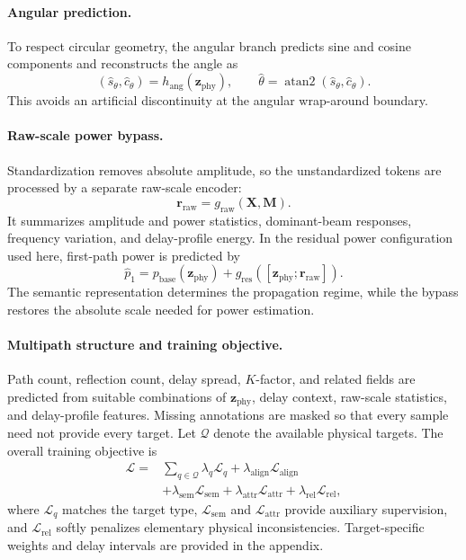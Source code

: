 \paragraph{Angular prediction.}
To respect circular geometry, the angular branch predicts sine and cosine components and reconstructs
the angle as
\begin{equation}
(\hat s_\theta,\hat c_\theta)=h_{\mathrm{ang}}(\mathbf z_{\mathrm{phy}}),
\qquad
\hat\theta=\operatorname{atan2}(\hat s_\theta,\hat c_\theta).
\label{eq:angular-prediction}
\end{equation}
This avoids an artificial discontinuity at the angular wrap-around boundary.

\paragraph{Raw-scale power bypass.}
Standardization removes absolute amplitude, so the unstandardized tokens are processed by a separate
raw-scale encoder:
\begin{equation}
\mathbf r_{\mathrm{raw}}=g_{\mathrm{raw}}(\mathbf X,\mathbf M).
\label{eq:raw-power-feature}
\end{equation}
It summarizes amplitude and power statistics, dominant-beam responses, frequency variation, and
delay-profile energy. In the residual power configuration used here, first-path power is predicted by
\begin{equation}
\hat p_1=p_{\mathrm{base}}(\mathbf z_{\mathrm{phy}})
+g_{\mathrm{res}}([\mathbf z_{\mathrm{phy}};\mathbf r_{\mathrm{raw}}]).
\label{eq:residual-power-prediction}
\end{equation}
The semantic representation determines the propagation regime, while the bypass restores the absolute
scale needed for power estimation.

\paragraph{Multipath structure and training objective.}
Path count, reflection count, delay spread, $K$-factor, and related fields are predicted from suitable
combinations of $\mathbf z_{\mathrm{phy}}$, delay context, raw-scale statistics, and delay-profile
features. Missing annotations are masked so that every sample need not provide every target. Let
$\mathcal Q$ denote the available physical targets. The overall training objective is
\begin{align}
\mathcal L
={}&\sum_{q\in\mathcal Q}\lambda_q\mathcal L_q
+\lambda_{\mathrm{align}}\mathcal L_{\mathrm{align}}
\nonumber\\
&+\lambda_{\mathrm{sem}}\mathcal L_{\mathrm{sem}}
+\lambda_{\mathrm{attr}}\mathcal L_{\mathrm{attr}}
+\lambda_{\mathrm{rel}}\mathcal L_{\mathrm{rel}},
\label{eq:overall-training-objective}
\end{align}
where $\mathcal L_q$ matches the target type, $\mathcal L_{\mathrm{sem}}$ and
$\mathcal L_{\mathrm{attr}}$ provide auxiliary supervision, and $\mathcal L_{\mathrm{rel}}$ softly
penalizes elementary physical inconsistencies. Target-specific weights and delay intervals are provided
in the appendix.

